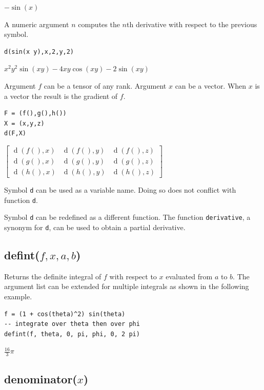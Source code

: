 \documentclass[12pt]{article}
\begin{document}
\noindent
$-\sin(x)$

\bigskip
\noindent
A numeric argument $n$ computes the $n$th derivative with respect to the previous symbol.

{\color{blue}
\begin{verbatim}
d(sin(x y),x,2,y,2)
\end{verbatim}
}

\noindent
$x^2y^2\sin(xy)-4xy\cos(xy)-2\sin(xy)$

\bigskip
\noindent
Argument $f$ can be a tensor of any rank.
Argument $x$ can be a vector.
When $x$ is a vector the result is the gradient of $f$.

{\color{blue}
\begin{verbatim}
F = (f(),g(),h())
X = (x,y,z)
d(F,X)
\end{verbatim}
}

\noindent
$\displaystyle
\begin{bmatrix}
\operatorname{d}(f(),x) & \operatorname{d}(f(),y) &  \operatorname{d}(f(),z)
\\[1ex]
\operatorname{d}(g(),x) & \operatorname{d}(g(),y) &  \operatorname{d}(g(),z)
\\[1ex]
\operatorname{d}(h(),x) & \operatorname{d}(h(),y) &  \operatorname{d}(h(),z)
\end{bmatrix}
$

\bigskip
\noindent
Symbol \verb$d$ can be used as a variable name.
Doing so does not conflict with function \verb$d$.

\bigskip
\noindent
Symbol \verb$d$ can be redefined as a different function.
The function \verb$derivative$, a synonym for \verb$d$, can be used to obtain a partial derivative.

\subsection*{defint($f,x,a,b$)}

Returns the definite integral of $f$ with respect to $x$
evaluated from $a$ to $b$.
The argument list can be extended for multiple integrals
as shown in the following example.

{\color{blue}
\begin{verbatim}
f = (1 + cos(theta)^2) sin(theta)
-- integrate over theta then over phi
defint(f, theta, 0, pi, phi, 0, 2 pi)
\end{verbatim}
}

\noindent
$\tfrac{16}{3}\pi$

\subsection*{denominator($x$)}
\end{document}
